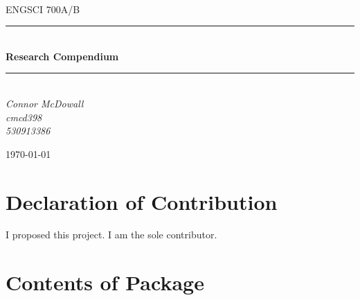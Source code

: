 \documentclass[12pt]{article}
\begin{document}
\begin{titlepage}
	\newcommand{\HRule}{\rule{\linewidth}{0.5mm}} %
	
	\center
	
	
	\textsc{\LARGE }\\[1.5cm] %
	
	\textsc{\Large ENGSCI 700A/B}\\[0.5cm] %
	
	
	\HRule\\[0.5cm]
	
	{\huge\bfseries Research Compendium}\\[0.4cm] %
	
	\HRule\\[0.5cm]
	
	
	{\large\textit{Connor McDowall \\cmcd398 \\530913386}}\\
	
	
	\vfill\vfill\vfill %
	
	{\large\today} %
	 
	
	\vfill %
	
\end{titlepage}
\section*{Declaration of Contribution}
I proposed this project. I am the sole contributor.
\section*{Contents of Package}
\tableofcontents
\listoffigures
\newpage
\end{document}
